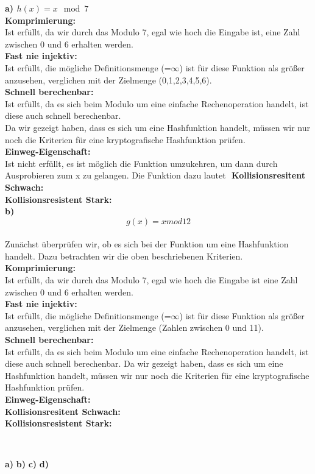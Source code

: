 \documentclass[german]{../uebung}
\begin{document}
\begin{exercise}{1}
	\textbf{a) \(h(x) = x \mod 7\)}\\
	\textbf{Komprimierung:}\\
	Ist erfüllt, da wir durch das Modulo 7, egal wie hoch die Eingabe ist, eine Zahl zwischen 0 und 6 erhalten werden.\\
	\textbf{Fast nie injektiv:}\\
	Ist erfüllt, die mögliche Definitionsmenge (=\(\infty\)) ist für diese Funktion als größer anzusehen, verglichen mit der Zielmenge (0,1,2,3,4,5,6).\\
	\textbf{Schnell berechenbar:}\\
	Ist erfüllt, da es sich beim Modulo um eine einfache Rechenoperation handelt, ist diese auch schnell berechenbar.\\
	Da wir gezeigt haben, dass es sich um eine Hashfunktion handelt, müssen wir nur noch die Kriterien für eine kryptografische Hashfunktion prüfen.\\
	\textbf{Einweg-Eigenschaft:}\\
	Ist nicht erfüllt, es ist möglich die Funktion umzukehren, um dann durch Ausprobieren zum x zu gelangen. Die Funktion dazu lautet \(\)
	\textbf{Kollisionsresitent Schwach:}\\
	\textbf{Kollisionsresistent Stark:}\\
	\textbf{b) \[g(x) = x mod 12\]}\\
	Zunächst überprüfen wir, ob es sich bei der Funktion um eine Hashfunktion handelt. Dazu betrachten wir die oben beschriebenen Kriterien.\\
	\textbf{Komprimierung:}\\
	Ist erfüllt, da wir durch das Modulo 7, egal wie hoch die Eingabe ist eine Zahl zwischen 0 und 6 erhalten werden.\\
	\textbf{Fast nie injektiv:}\\
	Ist erfüllt, die mögliche Definitionsmenge (=\(\infty\)) ist für diese Funktion als größer anzusehen, verglichen mit der Zielmenge (Zahlen zwischen 0 und 11).\\
	\textbf{Schnell berechenbar:}\\
	Ist erfüllt, da es sich beim Modulo um eine einfache Rechenoperation handelt, ist diese auch schnell berechenbar.
	Da wir gezeigt haben, dass es sich um eine Hashfunktion handelt, müssen wir nur noch die Kriterien für eine kryptografische Hashfunktion prüfen.\\
	\textbf{Einweg-Eigenschaft:}\\
	\textbf{Kollisionsresitent Schwach:}\\
	\textbf{Kollisionsresistent Stark:}\\
\end{exercise}\\

\begin{exercise}{2}
\end{exercise}

\begin{exercise}{3}

\end{exercise}
\begin{exercise}{4}
	\textbf{a)}
	\textbf{b)}
	\textbf{c)}
	\textbf{d)}
\end{exercise}
\begin{exercise}{5}

\end{exercise}
\end{document}
